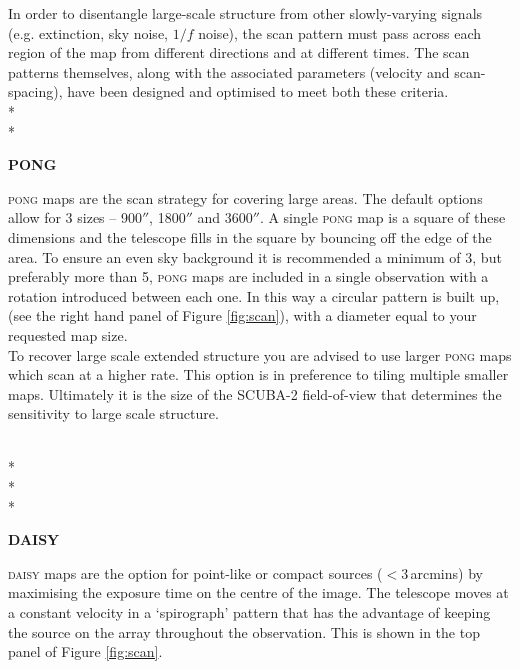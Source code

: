 \documentclass[twoside,11pt]{article}
\renewcommand{\_}{\texttt{\symbol{95}}}
\begin{document}
In order to disentangle large-scale structure from other slowly-varying signals (e.g. extinction, sky noise, $1/f$ noise), the scan pattern must pass across each region of the map from different directions and at different times. The scan patterns themselves, along with the associated parameters (velocity and scan-spacing), have been designed and optimised to meet both these criteria.
\\*\\*
\begin{minipage}[t]{0.12\linewidth}
\textbf{PONG}
\end{minipage}
\begin{minipage}[t]{0.85\linewidth}\textsc{pong} maps are the scan strategy for covering large areas. The default options allow for 3 sizes -- 900$''$, 1800$''$ and 3600$''$. A single \textsc{pong} map is a square of these dimensions and the telescope fills in the square by bouncing off the edge of the area. To ensure an even sky background it is recommended a minimum of 3, but preferably more than 5, \textsc{pong} maps are included in a single observation with a rotation introduced between each one. In this way a circular pattern is built up, (see the right hand panel of Figure \ref{fig:scan}), with a diameter equal to your requested map size. 
\vspace{0.2cm}\\
To recover large scale extended structure you are advised to use larger \textsc{pong} maps which scan at a higher rate. This option is in preference to tiling multiple smaller maps. Ultimately it is the size of the SCUBA-2 field-of-view that determines the sensitivity to large scale structure.
\end{minipage}
\\*\\*\\*
\begin{minipage}[t]{0.12\linewidth}
\textbf{DAISY}
\end{minipage}
\begin{minipage}[t]{0.85\linewidth}
\textsc{daisy} maps are the option for point-like or compact sources ($<$3\,arcmins) by maximising the exposure time on the centre of the image. The telescope moves at a constant velocity in a `spirograph' pattern that has the advantage of keeping the source on the array throughout the observation. This is shown in the top panel of Figure \ref{fig:scan}.
\end{minipage}
\end{document}
